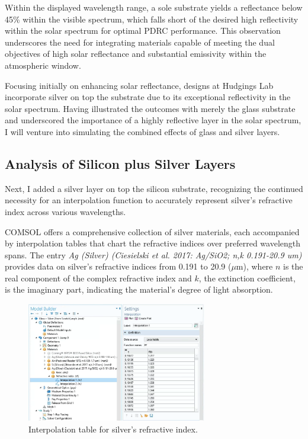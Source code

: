 Within the displayed wavelength range, a sole substrate yields a reflectance below  45\% within the visible spectrum, which falls short of the desired high reflectivity within the solar spectrum for optimal PDRC performance. This observation underscores the need for integrating materials capable of meeting the dual objectives of high solar reflectance and substantial emissivity within the atmospheric window.

Focusing initially on enhancing solar reflectance, designs at Hudgings Lab incorporate silver on top the substrate due to its exceptional reflectivity in the solar spectrum. Having illustrated the outcomes with merely the glass substrate and underscored the importance of a highly reflective layer in the solar spectrum, I will venture into simulating the combined effects of glass and silver layers.


\subsection{Analysis of Silicon plus Silver Layers}
Next, I added a silver layer on top the silicon substrate, recognizing the continued necessity for an interpolation function to accurately represent silver's refractive index across various wavelengths.

COMSOL offers a comprehensive collection of silver materials, each accompanied by interpolation tables that chart the refractive indices over preferred wavelength spans. The entry \emph{Ag (Silver) (Ciesielski et al. 2017: Ag/SiO2; n,k 0.191-20.9 um)} provides data on silver’s refractive indices from 0.191 to 20.9 ($\mu$m), where $n$ is the real component of the complex refractive index and $k$, the extinction coefficient, is the imaginary part, indicating the material's degree of light absorption.

\begin{figure}[H]
  \centering
  \includegraphics[width=0.7\textwidth]{Chapters/Figures/Chapter 4 Figures/Interpolation Table for Silver.png}
  \caption{Interpolation table for silver's refractive index.}
  \label{fig:Interpolation table for silver's refractive index}
\end{figure}

